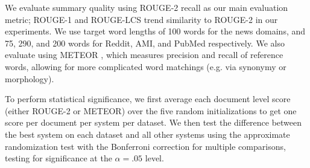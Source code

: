 
We evaluate summary quality using ROUGE-2 recall \cite{lin2004rouge} 
as our main evaluation metric;
ROUGE-1 and ROUGE-LCS trend similarity to ROUGE-2 in our experiments.
We use target word lengths of 100 words for the news domains, and 
75, 290, and 200 words for Reddit, AMI, and PubMed respectively.
We also evaluate using METEOR \cite{denkowski:lavie:meteor-wmt:2014},
which measures precision and recall of reference words, allowing for
more complicated word matchings (e.g. via synonymy or morphology).




To perform statistical significance, we first average each document level score
(either ROUGE-2 or METEOR) over the five random initializations to get
one score per document per system per dataset.
We then test the difference between the best system on each dataset and 
all other systems using the approximate randomization test 
\cite{riezler2005some} with the Bonferroni correction for multiple comparisons,
testing for significance at the $\alpha=.05$ level. 




